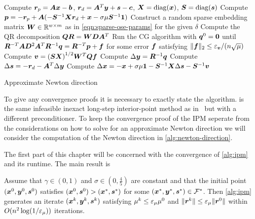 \begin{algorithm}[p]
  Compute \(\bm{r}_p = \bm{A}\bm{x} - \bm{b}\), \(\bm{r}_d = \bm{A}^T \bm{y} + \bm{s} - \bm{c}\), \(\bm{X} = \operatorname{diag}(\bm{x})\), \(\bm{S} = \operatorname{diag}(\bm{s})\)\;
  Compute \(\bm{p} = -\bm{r}_p + \bm{A}(-\bm{S}^{-1}\bm{X}\bm{r}_d + \bm{x} - \sigma \mu \bm{S}^{-1} \bm{1})\)\;
  Construct a random sparse embedding matrix \(\bm{W} \in \mathbb{R}^{w \times m}\) as in \cref{eqn:sparse-ose-params} for the given \(\delta\)\;
  Compute the QR decomposition \(\bm{Q} \bm{R} = \bm{W} \bm{D} \bm{A}^T\)\;
  Run the CG algorithm with \(\bm{q}^0 = \bm{0}\) until \(\bm{R}^{-T} \bm{A} \bm{D}^2 \bm{A}^T \bm{R}^{-1} \bm{q} = \bm{R}^{-T} \bm{p} + \bm{f}\) for some error \(\bm{f}\) satisfying \(\lVert \bm{f} \rVert_2 \leq \varepsilon_{\bm{v}}/(n \sqrt{\mu})\)\;\label{line:cg}
  Compute \(\bm{v} = {(\bm{S} \bm{X})}^{1/2} \bm{W}^T \bm{Q} \bm{f}\)\;\label{line:compute-v}
  Compute \(\Delta\bm{y} = \bm{R}^{-1}\bm{q}\)\;
  Compute \(\Delta\bm{s} = -\bm{r}_d - \bm{A}^T \Delta\bm{y}\)\;
  Compute \(\Delta\bm{x} = -\bm{x} + \sigma \mu \bm{1} - \bm{S}^{-1}\bm{X} \Delta\bm{s} - \bm{S}^{-1} \bm{v}\)\;\label{line:compute-delta-x}
  \;
  \caption{Approximate Newton direction}\label{alg:newton-direction}
\end{algorithm}

To give any convergence proofs it is necessary to exactly state the algorithm.
 is the same infeasible inexact long-step interior-point method as in~\cite{Avron-FasterRandomizedInfeasibleIPMs,Monteiro-ConvergenceAnalysisLongStepInfeasibleIPMs} but with a different preconditioner.
To keep the convergence proof of the IPM seperate from the considerations on how to solve for an approximate Newton direction we will consider the computation of the Newton direction in \cref{alg:newton-direction}.

The first part of this chapter will be concerned with the convergence of \cref{alg:ipm} and its runtime.
The main result is
\begin{theorem}
Assume that \(\gamma \in (0, 1)\) and \(\sigma \in (0, \frac{4}{5})\) are constant and that the initial point \((\bm{x}^0, \bm{y}^0, \bm{s}^0)\) satisfies \((\bm{x}^0, \bm{s}^0) > (\bm{x}^*, \bm{s}^*)\) for some \((\bm{x}^*, \bm{y}^*, \bm{s}^*) \in \mathcal{F}^*\).
Then \cref{alg:ipm} generates an iterate \((\bm{x}^k, \bm{y}^k, \bm{s}^k)\) satisfying \(\mu^k \leq \varepsilon_\mu \mu^0\) and \(\lVert \bm{r}^k \rVert \leq \varepsilon_\mu \lVert \bm{r}^0 \rVert\) within \(O(n^2 \log(1/\varepsilon_\mu))\) iterations.
\end{theorem}


